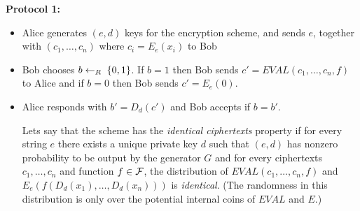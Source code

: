 \documentclass{article}
\begin{document}
\begin{enumerate}
\textbf{Protocol 1:}%

\begin{itemize}%

\item{}
Alice generates $(e,d)$ keys for the encryption scheme, and sends $e$, together with $(c_1,\ldots,c_n)$ where $c_i =E_e(x_i)$ to Bob%

\item{}
Bob chooses $b\leftarrow_R\;\{0,1\}$. If $b=1$ then Bob sends $c'=EVAL(c_1,\ldots,c_n,f)$ to Alice and if $b=0$ then Bob sends $c'=E_e(0)$.%

\item{}
Alice responds with $b'=D_d(c')$ and Bob accepts if $b=b'$.%

Lets say that the scheme has the \emph{identical ciphertexts} property if for every string $e$ there exists a unique private key $d$ such that $(e,d)$ has nonzero probability to be  output by the generator $G$  and for every ciphertexts  $c_1,\ldots,c_n$ and function $f\in\mathcal{F}$, the distribution of $EVAL(c_1,\ldots,c_n,f)$ and $E_e(f(D_d(x_1),\ldots,D_d(x_n)))$ is \emph{identical}. (The randomness in this distribution is only over the potential internal coins of $EVAL$ and $E$.)%

\begin{enumerate}[noitemsep,topsep=\mdcompacttopsep,label=\alph*.]%


\end{enumerate}
\end{itemize}
\end{enumerate}
\end{document}
